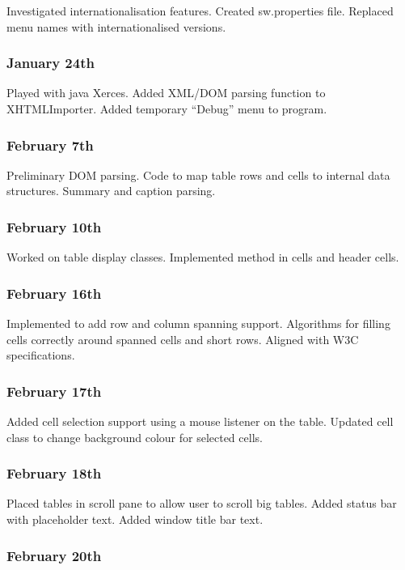 Investigated internationalisation features. Created sw.properties file.
Replaced menu names with internationalised versions.

\subsubsection{January 24th}

Played with java Xerces. Added XML/DOM parsing function to XHTMLImporter.
Added temporary ``Debug'' menu to program.

\subsubsection{February 7th}

Preliminary DOM parsing. Code to map table rows and cells to internal
data structures. Summary and caption parsing.

\subsubsection{February 10th}

Worked on table display classes. Implemented  method
in cells and header cells.

\subsubsection{February 16th}

Implemented  to add row and column spanning support. Algorithms
for filling cells correctly around spanned cells and short rows. Aligned
with W3C specifications.

\subsubsection{February 17th}

Added cell selection support using a mouse listener on the table. Updated
cell class to change background colour for selected cells.

\subsubsection{February 18th}

Placed tables in scroll pane to allow user to scroll big tables. Added status
bar with placeholder text. Added window title bar text.

\subsubsection{February 20th}

